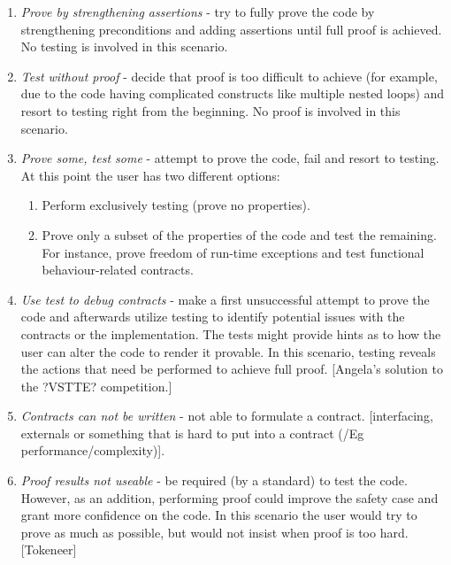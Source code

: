 \documentclass{llncs}
\begin{document}
\begin {enumerate}
  \item \emph{Prove by strengthening assertions} - try to fully prove the code by strengthening preconditions and adding assertions until full proof is achieved. No testing is involved in this scenario.

  \item \emph{Test without proof} - decide that proof is too difficult to achieve (for example, due
    to the code having complicated constructs like multiple nested
    loops) and resort to testing right from the beginning. No proof
    is involved in this scenario.

  \item \emph{Prove some, test some} - attempt to prove the code, fail and resort to testing. At this point the user has two different options:

    \begin{enumerate}
      \item Perform exclusively testing (prove no properties).

      \item Prove only a subset of the properties of the code and
        test the remaining. For instance, prove freedom of run-time
        exceptions and test functional behaviour-related contracts.
    \end{enumerate}

  \item \emph{Use test to debug contracts} - make a first unsuccessful attempt to prove the code and afterwards
    utilize testing to identify potential issues with the contracts or
    the implementation. The tests might provide hints as to how the user
    can alter the code to render it provable. In this scenario, testing
    reveals the actions that need be performed to achieve full proof.
    [Angela's solution to the ?VSTTE? competition.]

  \item \emph{Contracts can not be written} - not able to formulate a contract. [interfacing, externals or something
    that is hard to put into a contract (/Eg performance/complexity)].

  \item \emph{Proof results not useable} - be required (by a standard) to test the code. However, as an addition,
    performing proof could improve the safety case and grant more confidence on the
    code. In this scenario the user would try to prove as much as possible, but would
    not insist when proof is too hard.
    [Tokeneer]
\end{enumerate}
\end{document}
